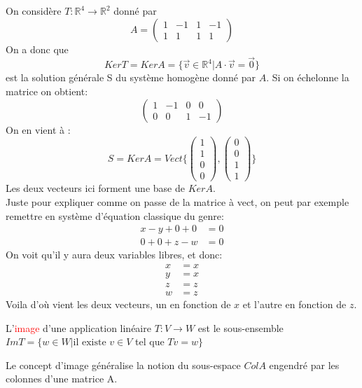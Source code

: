 \begin{exemple}
    On considère $T : \mathbb{R}^4 \to \mathbb{R}^2$ donné par
    \[A = \begin{pmatrix}
        1 & -1 & 1 & -1 \\ 1 & 1 & 1 & 1
    \end{pmatrix}\]
    On a donc que 
    \[Ker T = Ker A = \{\vec{v}\in \mathbb{R}^4| A \cdot \vec{v}= \vec{0}\}\]
    est la solution générale S du système homogène donné par $A$. Si on échelonne la matrice on obtient:
    \[\begin{pmatrix}
        1 & -1 & 0 & 0 \\ 0 & 0 & 1 & -1
    \end{pmatrix}\]
    On en vient à :
    \[S = Ker A = Vect \{ \begin{pmatrix}
        1 \\ 1 \\ 0 \\ 0
    \end{pmatrix}, \begin{pmatrix}
        0 \\ 0 \\ 1 \\ 1
    \end{pmatrix}\}\]
    Les deux vecteurs ici forment une base de $Ker A$.
    \\
    Juste pour expliquer comme on passe de la matrice à vect, on peut par exemple remettre en système d'équation classique du genre:
    \begin{align*}
        x -y + 0 + 0 &= 0\\
        0 + 0 + z - w &= 0
    \end{align*}
    On voit qu'il y aura deux variables libres, et donc:
    \begin{align*}
        x &= x \\
        y &= x\\
        z &= z\\
        w &= z
    \end{align*}
    Voila d'où vient les deux vecteurs, un en fonction de $x$ et l'autre en fonction de $z$.
\end{exemple}

\begin{definition}
    L'\textcolor{red}{image} d'une application linéaire $T : V \to W$ est le sous-ensemble $Im T = \{w \in W| \text{il existe } v \in V $ tel que $Tv = w\}$
\end{definition}
\begin{framedremark}
    Le concept d'image généralise la notion du sous-espace $Col A$ engendré par les colonnes d'une matrice A.
\end{framedremark}

